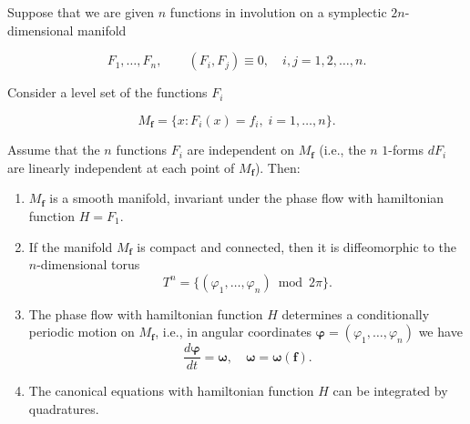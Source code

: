 Suppose that we are given $n$ functions in involution on a symplectic $2n$-dimensional manifold

$$F_1, \ldots, F_n, \qquad (F_i, F_j) \equiv 0, \quad i, j = 1, 2, \ldots, n.$$

Consider a level set of the functions $F_i$

$$M_{\mathbf{f}} = \{ x : F_i(x) = f_i, \; i = 1, \ldots, n \}.$$

Assume that the $n$ functions $F_i$ are independent on $M_{\mathbf{f}}$ (i.e., the $n$ $1$-forms $dF_i$ are linearly independent at each point of $M_{\mathbf{f}}$). Then:

\begin{enumerate}
  \item $M_{\mathbf{f}}$ is a smooth manifold, invariant under the phase flow with hamiltonian function $H = F_1$.
  \item If the manifold $M_{\mathbf{f}}$ is compact and connected, then it is diffeomorphic to the $n$-dimensional torus
    $$T^n = \{ (\varphi_1, \ldots, \varphi_n) \bmod 2\pi \}.$$
  \item The phase flow with hamiltonian function $H$ determines a conditionally periodic motion on $M_{\mathbf{f}}$, i.e., in angular coordinates $\boldsymbol{\varphi} = (\varphi_1, \ldots, \varphi_n)$ we have
    $$\frac{d\boldsymbol{\varphi}}{dt} = \boldsymbol{\omega}, \quad \boldsymbol{\omega} = \boldsymbol{\omega}(\mathbf{f}).$$
  \item The canonical equations with hamiltonian function $H$ can be integrated by quadratures.
\end{enumerate}
